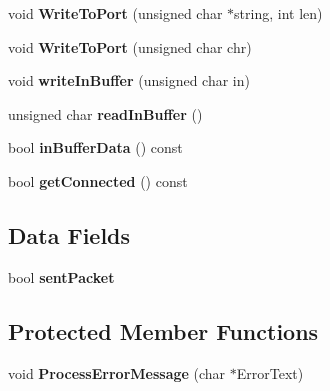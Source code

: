 \begin{DoxyCompactItemize}
\item 
\hypertarget{classCSerialPort_ac5084fd35c6d431f0bb32fa4184d46cd}{
void {\bfseries WriteToPort} (unsigned char $\ast$string, int len)}
\label{classCSerialPort_ac5084fd35c6d431f0bb32fa4184d46cd}

\item 
\hypertarget{classCSerialPort_aa6e70c30d2094e93b57bf29ed2da9544}{
void {\bfseries WriteToPort} (unsigned char chr)}
\label{classCSerialPort_aa6e70c30d2094e93b57bf29ed2da9544}

\item 
\hypertarget{classCSerialPort_ad7ae2f1cfbefbdbe0b4c7dd1f8426546}{
void {\bfseries writeInBuffer} (unsigned char in)}
\label{classCSerialPort_ad7ae2f1cfbefbdbe0b4c7dd1f8426546}

\item 
\hypertarget{classCSerialPort_a78bf02e85438c4d05522cabb4d565860}{
unsigned char {\bfseries readInBuffer} ()}
\label{classCSerialPort_a78bf02e85438c4d05522cabb4d565860}

\item 
\hypertarget{classCSerialPort_a395595b1b7215e1c6a52e89105a213bf}{
bool {\bfseries inBufferData} () const }
\label{classCSerialPort_a395595b1b7215e1c6a52e89105a213bf}

\item 
\hypertarget{classCSerialPort_a7740299ef083ed1bfabc4cb9bd38dbfa}{
bool {\bfseries getConnected} () const }
\label{classCSerialPort_a7740299ef083ed1bfabc4cb9bd38dbfa}

\end{DoxyCompactItemize}
\subsection*{Data Fields}
\begin{DoxyCompactItemize}
\item 
\hypertarget{classCSerialPort_ac31f6f3a9e19c134e4e6a12276a1f37f}{
bool {\bfseries sentPacket}}
\label{classCSerialPort_ac31f6f3a9e19c134e4e6a12276a1f37f}

\end{DoxyCompactItemize}
\subsection*{Protected Member Functions}
\begin{DoxyCompactItemize}
\item 
\hypertarget{classCSerialPort_a411e1c0e48ea5cce9dc815b8348727b4}{
void {\bfseries ProcessErrorMessage} (char $\ast$ErrorText)}
\label{classCSerialPort_a411e1c0e48ea5cce9dc815b8348727b4}

\end{DoxyCompactItemize}
